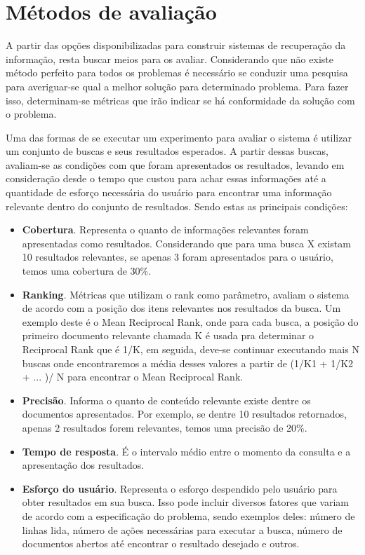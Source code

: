 \section{Métodos de avaliação}
A partir das opções disponibilizadas para construir sistemas de recuperação da informação, resta buscar meios para os avaliar. Considerando que não existe método perfeito para todos os problemas é necessário se conduzir uma pesquisa para averiguar-se qual a melhor solução para determinado problema. Para fazer isso, determinam-se métricas que irão indicar se há conformidade da solução com o problema.

Uma das formas de se executar um experimento para avaliar o sistema é utilizar um conjunto de buscas e seus resultados esperados. A partir dessas buscas, avaliam-se as condições com que foram apresentados os resultados, levando em consideração desde o tempo que custou para achar essas informações até a quantidade de esforço necessária do usuário para encontrar uma informação relevante dentro do conjunto de resultados. Sendo estas as principais condições:
\begin{itemize}
    \item \textbf{Cobertura}. Representa o quanto de informações relevantes foram apresentadas como resultados. Considerando que para uma busca X existam 10 resultados relevantes, se apenas 3 foram apresentados para o usuário, temos uma cobertura de 30\%.
    \item \textbf{Ranking}. Métricas que utilizam o rank como parâmetro, avaliam o sistema de acordo com a posição dos itens relevantes nos resultados da busca. Um exemplo deste é o Mean Reciprocal Rank, onde para cada busca, a posição do primeiro documento relevante chamada K é usada pra determinar o Reciprocal Rank que é 1/K, em seguida, deve-se continuar executando mais N buscas onde encontraremos a média desses valores a partir de (1/K1 + 1/K2 + ... )/ N para encontrar o Mean Reciprocal Rank.
    \item \textbf{Precisão}. Informa o quanto de conteúdo relevante existe dentre os documentos apresentados. Por exemplo, se dentre 10 resultados retornados, apenas 2 resultados forem relevantes, temos uma precisão de 20\%.
    \item \textbf{Tempo de resposta}. É o intervalo médio entre o momento da consulta e a apresentação dos resultados.
    \item \textbf{Esforço do usuário}. Representa o esforço despendido pelo usuário para obter resultados em sua busca. Isso pode incluir diversos fatores que variam de acordo com a especificação do problema, sendo exemplos deles: número de linhas lida, número de ações necessárias para executar a busca, número de documentos abertos até encontrar o resultado desejado e outros.
\end{itemize}

